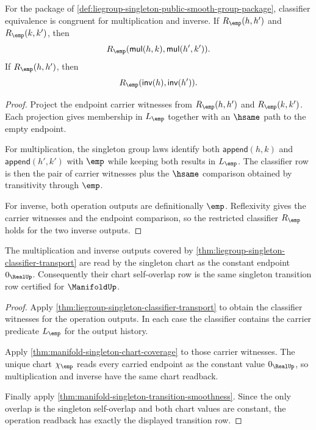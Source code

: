 \begin{theorem}
\label{thm:liegroup-singleton-classifier-transport}
For the package of
\autoref{def:liegroup-singleton-public-smooth-group-package}, classifier
equivalence is congruent for multiplication and inverse. If $R_{\emp}(h,h')$
and $R_{\emp}(k,k')$, then
$$
R_{\emp}(\mathsf{mul}(h,k),\mathsf{mul}(h',k')).
$$
If $R_{\emp}(h,h')$, then
$$
R_{\emp}(\mathsf{inv}(h),\mathsf{inv}(h')).
$$
\end{theorem}
\begin{proof}
Project the endpoint carrier witnesses from $R_{\emp}(h,h')$ and
$R_{\emp}(k,k')$. Each projection gives membership in $L_{\emp}$ together with
an $\hsame$ path to the empty endpoint.

For multiplication, the singleton group laws identify both
$\mathsf{append}(h,k)$ and $\mathsf{append}(h',k')$ with $\emp$ while keeping
both results in $L_{\emp}$. The classifier row is then the pair of carrier
witnesses plus the $\hsame$ comparison obtained by transitivity through
$\emp$.

For inverse, both operation outputs are definitionally $\emp$. Reflexivity gives
the carrier witnesses and the endpoint comparison, so the restricted classifier
$R_{\emp}$ holds for the two inverse outputs.
\end{proof}

\begin{theorem}
\label{thm:liegroup-singleton-chart-operation-readback}
The multiplication and inverse outputs covered by
\autoref{thm:liegroup-singleton-classifier-transport} are read by the singleton
chart as the constant endpoint $0_{\RealUp}$. Consequently their chart
self-overlap row is the same singleton transition row certified for
$\ManifoldUp$.
\end{theorem}
\begin{proof}
Apply \autoref{thm:liegroup-singleton-classifier-transport} to obtain the
classifier witnesses for the operation outputs. In each case the classifier
contains the carrier predicate $L_{\emp}$ for the output history.

Apply \autoref{thm:manifold-singleton-chart-coverage} to those carrier
witnesses. The unique chart $\chi_{\emp}$ reads every carried endpoint as the
constant value $0_{\RealUp}$, so multiplication and inverse have the same chart
readback.

Finally apply \autoref{thm:manifold-singleton-transition-smoothness}. Since the
only overlap is the singleton self-overlap and both chart values are constant,
the operation readback has exactly the displayed transition row.
\end{proof}

